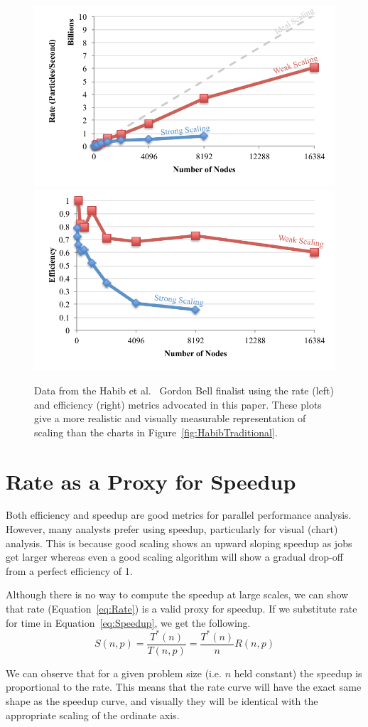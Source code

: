 \documentclass[conference]{IEEEtran}
\newcommand*{\scite}[1]{~\cite{#1}}
\newcommand{\etal}{et al.\xspace}
\begin{document}
\begin{figure}
  \includegraphics[width=.5\linewidth]{images/HabibRate}%
  \includegraphics[width=.5\linewidth]{images/HabibEfficiency}
  \caption{Data from the Habib \etal\scite{Habib2013} Gordon Bell finalist
    using the rate (left) and efficiency (right) metrics advocated in this
    paper. These plots give a more realistic and visually measurable
    representation of scaling than the charts in
    Figure~\ref{fig:HabibTraditional}.}
  \label{fig:HabibBetter}
\end{figure}


\section{Rate as a Proxy for Speedup}
\label{sec:RateProxy}

\noindent
Both efficiency and speedup are good metrics for parallel performance
analysis. However, many analysts prefer using speedup, particularly for
visual (chart) analysis. This is because good scaling shows an upward
sloping speedup as jobs get larger whereas even a good scaling algorithm
will show a gradual drop-off from a perfect efficiency of 1.

Although there is no way to compute the speedup at large scales, we can
show that rate (Equation~\ref{eq:Rate}) is a valid proxy for speedup. If we
substitute rate for time in Equation~\ref{eq:Speedup}, we get the
following.
\begin{equation}
  S(n,p) = \frac{T^*(n)}{T(n,p)} = \frac{T^*(n)}{n} R(n,p)
  \label{eq:SpeedupFromRate}
\end{equation}

We can observe that for a given problem size (i.e. $n$ held constant) the
speedup is proportional to the rate. This means that the rate curve will
have the exact same shape as the speedup curve, and visually they will be
identical with the appropriate scaling of the ordinate axis.
\end{document}
